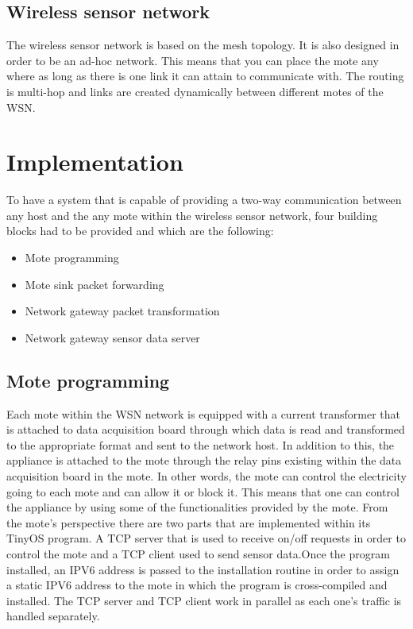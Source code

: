 \documentclass[conference]{IEEEtran}
\begin{document}
\subsection{Wireless sensor network}
The wireless sensor network is based on the mesh topology. It is also designed in order to be an ad-hoc network. This means that you can place the mote any where as long as there is one link it can attain to communicate with. The routing is multi-hop and links are created dynamically between different motes of the WSN.
\section{Implementation}
To have a system that is capable of providing a two-way communication between any host and the any mote within the wireless sensor network, four building blocks had to be provided and which are the following:
\begin{itemize}
\item Mote programming
\item Mote sink packet forwarding
\item Network gateway packet transformation
\item Network gateway sensor data server
\end{itemize}

\subsection{Mote programming}
Each mote within the WSN network is equipped with a current transformer that is attached to data acquisition board through which data is read and transformed to the appropriate format and sent to the network host. In addition to this, the appliance is attached to the mote through the relay pins existing within the data acquisition board in the mote. In other words, the mote can control the electricity going to each mote and can allow it or block it. This means that one can control the appliance by using some of the functionalities provided by the mote. From the mote's perspective there are two parts that are implemented within its TinyOS program. A TCP server that is used to receive on/off requests in order to control the mote and a TCP client used to send sensor data.Once the program installed, an IPV6 address is passed to the installation routine in order to assign a static IPV6 address to the mote in which the program is cross-compiled and installed. The TCP server and TCP client work in parallel as each one's traffic is handled separately.
\end{document}
